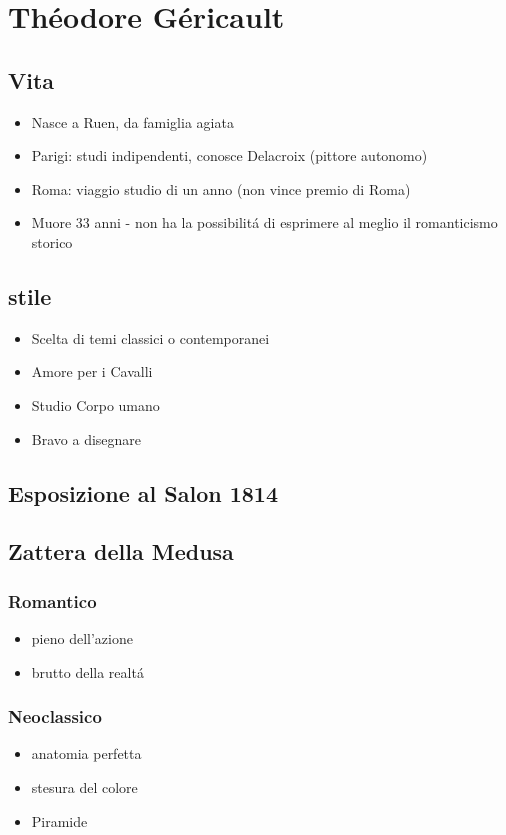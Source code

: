\documentclass{article}
\begin{document}
\section{Théodore Géricault}
\subsection{Vita}
\begin{itemize}
    \item Nasce a Ruen, da famiglia agiata
    \item Parigi: studi indipendenti, conosce Delacroix (pittore autonomo)
    \item Roma: viaggio studio di un anno (non vince premio di Roma)
    \item Muore 33 anni - non ha la possibilitá di esprimere al meglio il romanticismo storico
\end{itemize}
\subsection{stile}
\begin{itemize}
\item Scelta di temi classici o contemporanei
\item Amore per i Cavalli
\item Studio Corpo umano
\item Bravo a disegnare
\end{itemize}
\subsection{Esposizione al Salon 1814}
\subsection{Zattera della Medusa}
\subsubsection{Romantico}
\begin{itemize}
\item pieno dell'azione
\item brutto della realtá
\end{itemize}
\subsubsection{Neoclassico}
\begin{itemize}
\item anatomia perfetta
\item stesura del colore
\item Piramide
\end{itemize}
\end{document}
